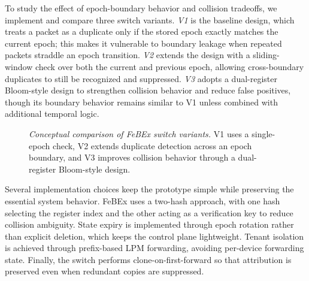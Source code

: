 To study the effect of epoch-boundary behavior and collision tradeoffs, we implement and compare three switch variants. \textit{V1} is the baseline design, which treats a packet as a duplicate only if the stored epoch exactly matches the current epoch; this makes it vulnerable to boundary leakage when repeated packets straddle an epoch transition. \textit{V2} extends the design with a sliding-window check over both the current and previous epoch, allowing cross-boundary duplicates to still be recognized and suppressed. \textit{V3} adopts a dual-register Bloom-style design to strengthen collision behavior and reduce false positives, though its boundary behavior remains similar to V1 unless combined with additional temporal logic.

\begin{figure}[t]
\centering
{}
\caption{\emph{Conceptual comparison of FeBEx switch variants.} V1 uses a single-epoch check, V2 extends duplicate detection across an epoch boundary, and V3 improves collision behavior through a dual-register Bloom-style design.}
\label{fig:v123-boundary-mitigation}
\end{figure}

Several implementation choices keep the prototype simple while preserving the essential system behavior. FeBEx uses a two-hash approach, with one hash selecting the register index and the other acting as a verification key to reduce collision ambiguity. State expiry is implemented through epoch rotation rather than explicit deletion, which keeps the control plane lightweight. Tenant isolation is achieved through prefix-based LPM forwarding, avoiding per-device forwarding state. Finally, the switch performs clone-on-first-forward so that attribution is preserved even when redundant copies are suppressed.

